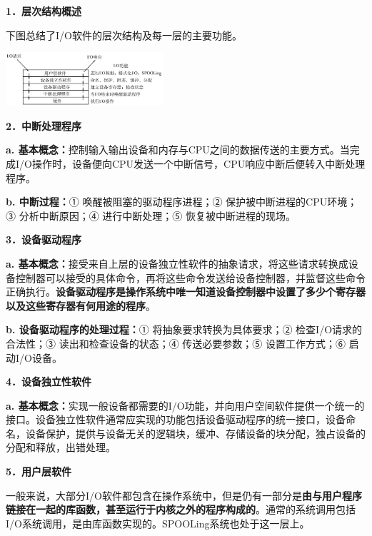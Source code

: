 \textbf{{1．层次结构概述}}

{下图总结了I/O软件的层次结构及每一层的主要功能。}

\includegraphics[width=2.29167in,height=0.78125in]{png-jpeg-pics/BA126AD149859BCD48B01C0444C33241.png}

\textbf{{2．中断处理程序}}

\textbf{a.
基本概念：}控制输入输出设备和内存与CPU之间的数据传送的主要方式。当完成I/O操作时，设备便向CPU发送一个中断信号，CPU响应中断后便转入中断处理程序。

\textbf{b. 中断过程：}① 唤醒被阻塞的驱动程序进程；②
保护被中断进程的CPU环境；③ 分析中断原因；④ 进行中断处理；⑤
恢复被中断进程的现场。

\textbf{{3．设备驱动程序}}

\textbf{a.
基本概念：}接受来自上层的设备独立性软件的抽象请求，将这些请求转换成设备控制器可以接受的具体命令，再将这些命令发送给设备控制器，并监督这些命令正确执行。\textbf{设备驱动程序是操作系统中唯一知道设备控制器中设置了多少个寄存器以及这些寄存器有何用途的程序}。

{\textbf{b. 设备驱动程序的处理过程：}}① 将抽象要求转换为具体要求；②
检查I/O请求的合法性；③ 读出和检查设备的状态；④ 传送必要参数；⑤
设置工作方式；⑥ 启动I/O设备。

\textbf{{4．设备独立性软件}}

\textbf{a.
基本概念：}实现一般设备都需要的I/O功能，并向用户空间软件提供一个统一的接口。设备独立性软件通常应实现的功能包括设备驱动程序的统一接口，设备命名，设备保护，提供与设备无关的逻辑块，缓冲、存储设备的块分配，独占设备的分配和释放，出错处理。

\textbf{{5．用户层软件}}

一般来说，大部分I/O软件都包含在操作系统中，但是仍有一部分是\textbf{由与用户程序链接在一起的库函数，甚至运行于内核之外的程序构成的}。通常的系统调用包括I/O系统调用，是由库函数实现的。SPOOLing系统也处于这一层上。
